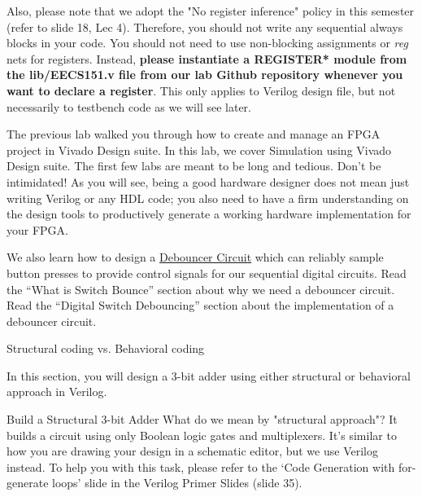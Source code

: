 \documentclass[11pt]{article}
\makeatletter
\renewcommand{\section}
{\@startsection {section}{1}{0pt}
 {-2ex}
 {1ex}
 {\bfseries\Large}}
\renewcommand{\subsection}
{\@startsection {subsection}{1}{0pt}
 {-1ex}
 {0.5ex}
 {\bfseries\normalsize}}
\makeatother
\begin{document}
Also, please note that we adopt the "No register inference" policy in this semester (refer to slide 18, Lec 4). Therefore, you should not write any sequential always blocks in your code. You should not need to use non-blocking assignments or \textit{reg} nets for registers. Instead, \textbf{please instantiate a REGISTER* module from the lib/EECS151.v file from our lab Github repository whenever you want to declare a register}. This only applies to Verilog design file, but not necessarily to testbench code as we will see later.

The previous lab walked you through how to create and manage an FPGA project in Vivado Design suite. In this lab, we cover Simulation using Vivado Design suite. The first few labs are meant to be long and tedious. Don't be intimidated! As you will see, being a good hardware designer does not mean just writing Verilog or any HDL code; you also need to have a firm understanding on the design tools to productively generate a working hardware implementation for your FPGA.

We also learn how to design a \href{http://www.labbookpages.co.uk/electronics/debounce.html}{\underline{Debouncer Circuit}} which can reliably sample button presses to provide control signals for our sequential digital circuits. Read the ``What is Switch Bounce'' section about why we need a debouncer circuit. Read the ``Digital Switch Debouncing'' section about the implementation of a debouncer circuit.

\section{Structural coding vs. Behavioral coding}

In this section, you will design a 3-bit adder using either structural or behavioral approach in Verilog.

\subsection{Build a Structural 3-bit Adder}
What do we mean by "structural approach"? It builds a circuit using only Boolean logic gates and multiplexers.
It's similar to how you are drawing your design in a schematic editor, but we use Verilog instead.
To help you with this task, please refer to the `Code Generation with for-generate loops' slide in the Verilog Primer Slides (slide 35).
\end{document}
